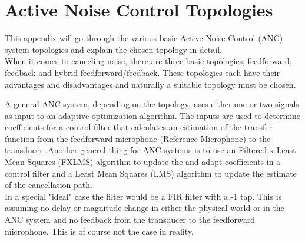 \section{Active Noise Control Topologies} \label{sec:BasicSystem}
This appendix will go through the various basic Active Noise Control (ANC) system topologies and explain the chosen topology in detail. \\
When it comes to canceling noise, there are three basic topologies; feedforward, feedback and hybrid feedforward/feedback. These topologies each have their advantages and disadvantages and naturally a suitable topology must be chosen.

A general ANC system, depending on the topology, uses either one or two signals as input to an adaptive optimization algorithm. The inputs are used to determine coefficients for a control filter that calculates an estimation of the transfer function from the feedforward microphone (Reference Microphone) to the transducer. Another general thing for ANC systems is to use an Filtered-x Least Mean Squares (FXLMS) algorithm to update the and adapt coefficients in a control filter and a Least Mean Squares (LMS) algorithm to update the estimate of the cancellation path.\\
In a special "ideal" case the filter would be a FIR filter with a -1 tap. This is assuming no delay or magnitude change in either the physical world or in the ANC system and no feedback from the transducer to the feedforward microphone. This is of course not the case in reality. 


